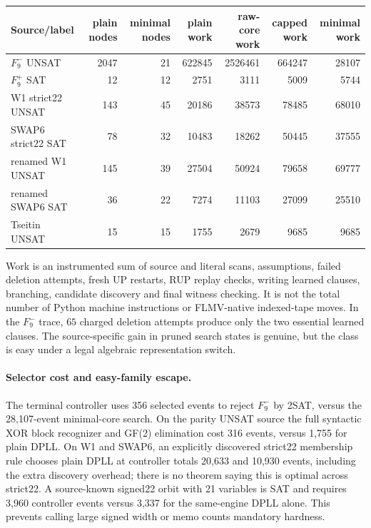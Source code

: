 \documentclass[10pt]{article}
\begin{document}
\begin{center}\small
\begin{tabular}{lrrrrrr}
\toprule
Source/label&plain nodes&minimal nodes&plain work&raw-core work&capped work&minimal work\\\midrule
$F_9^-$ UNSAT&2047&21&622845&2526461&664247&28107\\
$F_9^+$ SAT&12&12&2751&3111&5009&5744\\
W1 strict22 UNSAT&143&45&20186&38573&78485&68010\\
SWAP6 strict22 SAT&78&32&10483&18262&50445&37555\\
renamed W1 UNSAT&145&39&27504&50924&79658&69777\\
renamed SWAP6 SAT&36&22&7274&11103&27099&25510\\
Tseitin UNSAT&15&15&1755&2679&9685&9685\\\bottomrule
\end{tabular}
\end{center}

Work is an instrumented sum of source and literal scans, assumptions,
failed deletion attempts, fresh UP restarts, RUP replay checks, writing learned
clauses, branching, candidate discovery and final witness checking.
It is not the total number of Python machine instructions or FLMV-native
indexed-tape moves. In the $F_9^-$ trace, $65$ charged deletion attempts
produce only the two essential learned clauses. The source-specific gain in
pruned search states is genuine, but the class is easy under a legal algebraic
representation switch.

\paragraph{Selector cost and easy-family escape.} The terminal controller
uses 356 selected events to reject $F_9^-$ by 2SAT, versus the 28,107-event
minimal-core search. On the parity UNSAT source the full syntactic XOR block
recognizer and GF(2) elimination cost 316 events, versus 1,755 for plain DPLL.
On W1 and SWAP6, an explicitly discovered strict22 membership rule chooses
plain DPLL at controller totals 20,633 and 10,930 events, including the
extra discovery overhead; there is no theorem saying this is optimal across
strict22. A source-known signed22 orbit with 21 variables is SAT and requires
3,960 controller events versus 3,337 for the same-engine DPLL alone. This
prevents calling large signed width or memo counts mandatory hardness.
\end{document}
